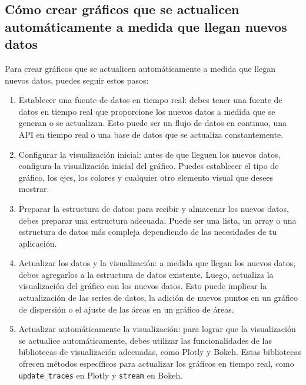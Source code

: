 \documentclass[
  a4paper,
]{article}
\begin{document}
\hypertarget{cuxf3mo-crear-gruxe1ficos-que-se-actualicen-automuxe1ticamente-a-medida-que-llegan-nuevos-datos}{%
\subsection{Cómo crear gráficos que se actualicen automáticamente a
medida que llegan nuevos
datos}\label{cuxf3mo-crear-gruxe1ficos-que-se-actualicen-automuxe1ticamente-a-medida-que-llegan-nuevos-datos}}

Para crear gráficos que se actualicen automáticamente a medida que
llegan nuevos datos, puedes seguir estos pasos:

\begin{enumerate}
\def\labelenumi{\arabic{enumi}.}
\item
  Establecer una fuente de datos en tiempo real: debes tener una fuente
  de datos en tiempo real que proporcione los nuevos datos a medida que
  se generan o se actualizan. Esto puede ser un flujo de datos en
  continuo, una API en tiempo real o una base de datos que se actualiza
  constantemente.
\item
  Configurar la visualización inicial: antes de que lleguen los nuevos
  datos, configura la visualización inicial del gráfico. Puedes
  establecer el tipo de gráfico, los ejes, los colores y cualquier otro
  elemento visual que desees mostrar.
\item
  Preparar la estructura de datos: para recibir y almacenar los nuevos
  datos, debes preparar una estructura adecuada. Puede ser una lista, un
  array o una estructura de datos más compleja dependiendo de las
  necesidades de tu aplicación.
\item
  Actualizar los datos y la visualización: a medida que llegan los
  nuevos datos, debes agregarlos a la estructura de datos existente.
  Luego, actualiza la visualización del gráfico con los nuevos datos.
  Esto puede implicar la actualización de las series de datos, la
  adición de nuevos puntos en un gráfico de dispersión o el ajuste de
  las áreas en un gráfico de áreas.
\item
  Actualizar automáticamente la visualización: para lograr que la
  visualización se actualice automáticamente, debes utilizar las
  funcionalidades de las bibliotecas de visualización adecuadas, como
  Plotly y Bokeh. Estas bibliotecas ofrecen métodos específicos para
  actualizar los gráficos en tiempo real, como \texttt{update\_traces}
  en Plotly y \texttt{stream} en Bokeh.
\end{enumerate}
\end{document}
